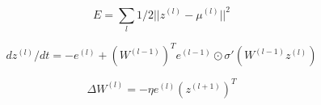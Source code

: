 \documentclass{article}
\begin{document}
\[E = \sum_l 1/2 ||z^{(l)} - \mu^{(l)}||^2
\]
\pagebreak

\[dz^{(l)}/dt = -e^{(l)} + (W^{(l-1)})^T e^{(l-1)} \odot \sigma'(W^{(l-1)}z^{(l)})
\]
\pagebreak

\[\Delta W^{(l)} = -\eta e^{(l)} (z^{(l+1)})^T
\]
\pagebreak
\end{document}

